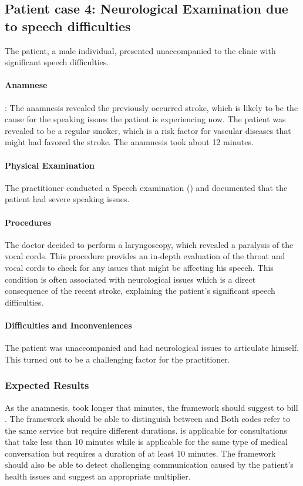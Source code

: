 \subsection{Patient case 4: Neurological Examination due to speech difficulties}\label{subsec:patient-case-4:-neurological-examination-due-to-speech-difficulties}
The patient, a male individual, presented unaccompanied to the clinic with significant speech difficulties.

\paragraph{Anamnese}:
The anamnesis revealed the previously occurred stroke, which is likely to be the cause for the speaking issues the patient is experiencing now.
The patient was revealed to be a regular smoker, which is a risk factor for vascular diseases that might had favored the stroke.
The anamnesis took about 12 minutes.

\paragraph{Physical Examination}
The practitioner conducted a Speech examination () and documented that the patient had severe speaking issues.

\paragraph{Procedures}
The doctor decided to perform a laryngoscopy, which revealed a paralysis of the vocal cords.
This procedure provides an in-depth evaluation of the throat and vocal cords to check for any issues that might be affecting his speech.
This condition is often associated with neurological issues which is a direct consequence of the recent stroke,
explaining the patient's significant speech difficulties.

\paragraph{Difficulties and Inconveniences}
The patient was unaccompanied and had neurological issues to articulate himself.
This turned out to be a challenging factor for the practitioner.

\subsubsection{Expected Results}
As the anamnesis, took longer that  minutes, the framework should suggest to bill .
The framework should be able to distinguish between  and 
Both codes refer to the same service but require different durations.
 is applicable for consultations that take less than 10 minutes while  is applicable for the same type of medical conversation but requires a duration of at least 10 minutes.
The framework should also be able to detect challenging communication caused by the patient's health issues and suggest an appropriate multiplier.

